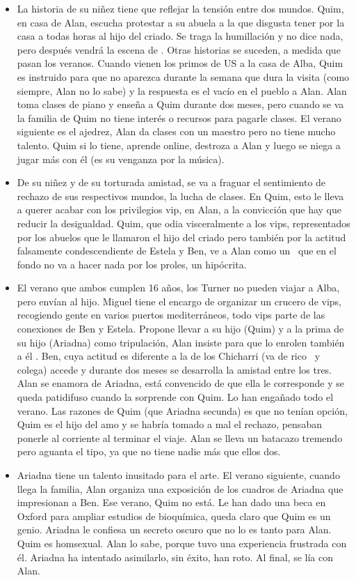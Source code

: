 \begin{itemize}
\item La historia de su niñez tiene que reflejar la tensión entre dos mundos. Quim, en casa de Alan, escucha protestar a su abuela a la que disgusta tener por la casa a todas horas al hijo del criado. Se traga la humillación y no dice nada, pero después vendrá la escena de . Otras historias se suceden, a medida que pasan los veranos. Cuando vienen los primos de US a la casa de Alba, Quim es instruido para  que no aparezca durante la semana que dura la visita (como siempre, Alan no lo sabe) y la respuesta es el vacío en el pueblo a Alan. Alan toma clases de piano y enseña a Quim durante dos meses, pero cuando se va la familia de Quim no tiene interés o recursos para pagarle clases. El verano siguiente es el ajedrez, Alan da clases con un maestro pero no tiene mucho talento. Quim si lo tiene, aprende online, destroza a Alan y luego se niega a jugar más con él (es su venganza por la música). 
\item De su niñez y de su torturada amistad, se va a fraguar el sentimiento de rechazo de sus respectivos mundos, la lucha de clases. En Quim, esto le lleva a querer acabar con los privilegios vip, en Alan, a la convicción que hay que reducir la desigualdad. Quim, que odia visceralmente a los vips, representados por los abuelos que le llamaron el hijo del criado pero también por la actitud falsamente condescendiente de Estela y Ben, ve a Alan como un ~que en el fondo no va a hacer nada por los proles, un hipócrita.  
\item El verano que ambos cumplen 16 años, los Turner no pueden viajar a Alba, pero envían al hijo. Miguel tiene el encargo de organizar un crucero de vips, recogiendo gente en varios puertos mediterráneos, todo vips parte de las conexiones de Ben y Estela. Propone llevar a su hijo (Quim) y a la prima de su hijo (Ariadna) como tripulación, Alan insiste para que lo enrolen también a él . Ben, cuya actitud es diferente a la de los Chicharri (va de rico ~y colega) accede y durante dos meses se desarrolla la amistad entre los tres. Alan se enamora de Ariadna, está convencido de que ella le corresponde y se queda patidifuso cuando la sorprende con Quim. Lo han engañado todo el verano. Las razones de Quim (que Ariadna secunda) es que no tenían opción, Quim es el hijo del amo y se habría tomado a mal el rechazo, pensaban ponerle al corriente al terminar el viaje. Alan se lleva un batacazo tremendo pero aguanta el tipo, ya que no tiene nadie más que ellos dos. 
\item Ariadna tiene un talento inusitado para el arte. El verano siguiente, cuando llega la familia, Alan organiza una exposición de los cuadros de Ariadna que impresionan a Ben. Ese verano, Quim no está. Le han dado una beca en Oxford para ampliar estudios de bioquímica, queda claro que Quim es un genio. Ariadna le confiesa un secreto oscuro que no lo es tanto para Alan. Quim es homsexual. Alan lo sabe, porque tuvo una experiencia frustrada con él. Ariadna ha intentado asimilarlo, sin éxito, han roto. Al final, se lía con Alan. 

\end{itemize}
